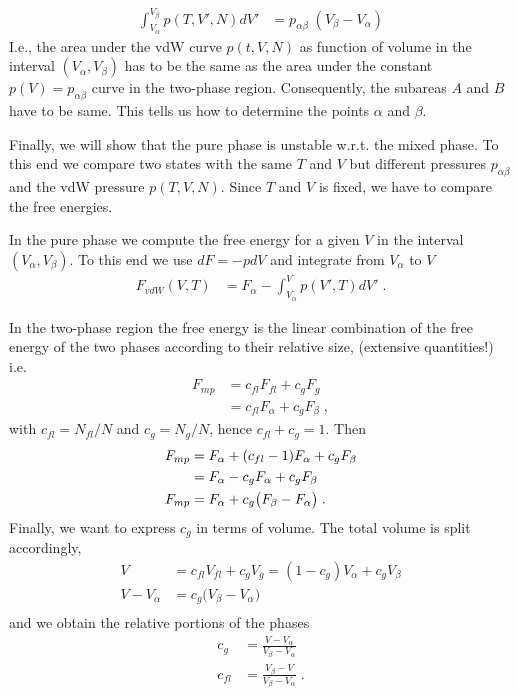 %
\begin{align}\label{eq:aux:vdW}
 \int_{V_{\alpha}}^{V_{\beta}} p(T,V',N)  dV' &=
 p_{\alpha\beta}\;(V_{\beta}-V_{\alpha})
\end{align}
%
I.e., the area under the vdW curve $p(t,V,N)$ as function of volume in the interval  $(V_{\alpha},V_{\beta})$
has to be the same as the area under the constant  $p(V)=p_{\alpha\beta}$ curve in the two-phase region. Consequently, the subareas $A$ and $B$ have to be same.
This tells us how to determine the points $\alpha$ and $\beta$.

Finally, we will show that the pure phase is unstable w.r.t. the mixed phase. To this end we compare two states with the same $T$ and $V$ but different pressures $p_{\alpha\beta}$
and the vdW pressure $p(T,V,N)$. Since $T$ and $V$ is fixed, we have to compare the free energies.

In the pure phase we compute the free energy for a given $V$ in the interval $(V_{\alpha},V_{\beta})$. To this end we use $dF=-pdV$ and integrate from $V_{\alpha}$ to $V$
%
\begin{align}\label{eq:F:vdW}
F_{vdW}(V,T) &= F_{\alpha} - \int_{V_{\alpha}}^{V} p(V',T) dV'\;.
\end{align}
%



In the two-phase region the free energy is the linear combination of the free energy of the two phases according to their relative size, (extensive quantities!) i.e. 
%
\begin{align}\label{eq:}
F_{mp} &=  c_{fl} F_{fl} + c_{g} F_{g}\\
 &=  c_{fl} F_{\alpha} + c_{g} F_{\beta}\;,
\end{align}
%
with $c_{fl}=N_{fl}/N$ and $c_{g}=N_{g}/N$, hence $c_{fl}+c_{g}=1$\;.
Then
\begin{align}
F_{mp} &=  F_{\alpha}+ (c_{fl}-1) F_{\alpha} + c_{g} F_{\beta}\notag\\
 &=  F_{\alpha}- c_{g} F_{\alpha} + c_{g} F_{\beta}\notag\\
F_{mp}  &=  F_{\alpha}+  c_{g} \big(F_{\beta}-F_{\alpha}\big)\label{eq:F:mp:a}\;.
\end{align}
%
Finally, we want  to express $c_{g}$ in terms of volume. The total volume is split accordingly,
%
\begin{align*}
V &= c_{fl} V_{fl} + c_{g} V_{g} = (1-c_{g}) V_{\alpha} + c_{g} V_{\beta} \\
V-V_{\alpha} &= c_{g} \big(V_{\beta}-V_{\alpha}  \big)\\
\end{align*}
%
and we obtain the relative portions of the phases
%
\begin{subequations}\label{eq:rel:port:phase}
\begin{align}
c_{g} &= \frac{V-V_{\alpha} }{V_{\beta}-V_{\alpha} }\\
c_{fl} &=\frac{V_{\beta}-V }{V_{\beta}-V_{\alpha} }\;.
\end{align}
\end{subequations}


